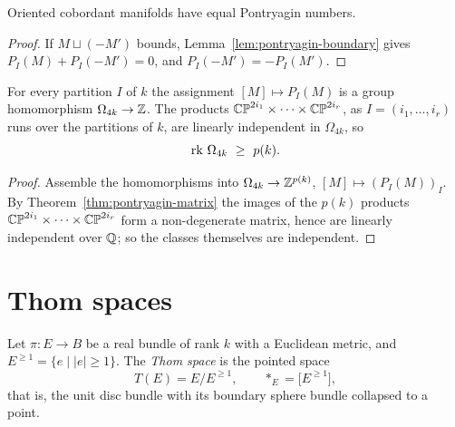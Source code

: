 \begin{lemma}
Oriented cobordant manifolds have equal Pontryagin numbers.
\end{lemma}

\begin{proof}
If $M\sqcup(-M')$ bounds, Lemma~\ref{lem:pontryagin-boundary} gives
$P_I(M)+P_I(-M')=0$, and $P_I(-M')=-P_I(M')$.
\end{proof}

\begin{corollary}\label{cor:rank-omega}
For every partition $I$ of $k$ the assignment $[M]\mapsto P_I(M)$ is a group
homomorphism $\Omega_{4k}\to\mathbb{Z}$. The products
$\mathbb{CP}^{2i_1}\times\dots\times\mathbb{CP}^{2i_r}$, as $I=(i_1,\dots,i_r)$ runs over the
partitions of $k$, are linearly independent in $\Omega_{4k}$, so
\[
\rk\,\Omega_{4k}\ \ge\ p(k).
\]
\end{corollary}

\begin{proof}
Assemble the homomorphisms into
$\Omega_{4k}\to\mathbb{Z}^{p(k)}$, $[M]\mapsto(P_I(M))_I$. By
Theorem~\ref{thm:pontryagin-matrix} the images of the $p(k)$ products
$\mathbb{CP}^{2i_1}\times\dots\times\mathbb{CP}^{2i_r}$ form a non-degenerate matrix, hence are
linearly independent over $\mathbb{Q}$; so the classes themselves are independent.
\end{proof}

\section{Thom spaces}

\begin{definition}
Let $\pi\colon E\to B$ be a real bundle of rank $k$ with a Euclidean metric, and
$E^{\ge1}=\{e\mid |e|\ge1\}$. The \emph{Thom space} is the pointed space
\[
T(E)=E\big/E^{\ge1},
\qquad
*_E=\big[E^{\ge1}\big],
\]
that is, the unit disc bundle with its boundary sphere bundle collapsed to a
point.
\end{definition}

\begin{center}
\end{center}

